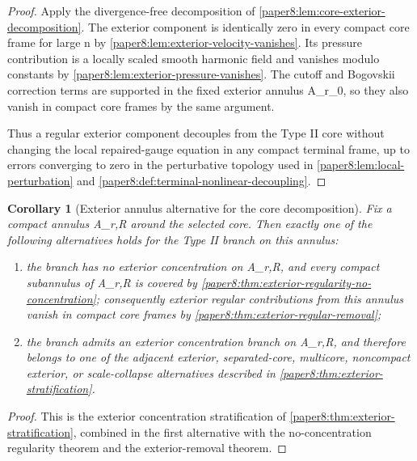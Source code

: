 \documentclass[11pt]{amsart}
\def\({}%
\def\){}%
\theoremstyle{plain}
\newtheorem{corollary}[corollary]{Corollary}
\theoremstyle{definition}
\theoremstyle{remark}
\begin{document}
\begin{proof}
Apply the divergence-free decomposition of
\cref{paper8:lem:core-exterior-decomposition}.  The exterior component is
identically zero in every compact core frame for large \(n\) by
\cref{paper8:lem:exterior-velocity-vanishes}.  Its pressure contribution is a
locally scaled smooth harmonic field and vanishes modulo constants by
\cref{paper8:lem:exterior-pressure-vanishes}.  The cutoff and Bogovskii
correction terms are supported in the fixed exterior annulus \(A_{r_0}\), so
they also vanish in compact core frames by the same argument.

Thus a regular exterior component decouples from the Type II core without
changing the local repaired-gauge equation in any compact terminal frame, up
to errors converging to zero in the perturbative topology used in
\cref{paper8:lem:local-perturbation} and
\cref{paper8:def:terminal-nonlinear-decoupling}.
\end{proof}

\begin{corollary}[Exterior annulus alternative for the core decomposition]
\label{paper8:cor:exterior-annulus-alternative}
Fix a compact annulus \(A_{r,R}\) around the selected core.  Then exactly one
of the following alternatives holds for the Type II branch on this annulus:
\begin{enumerate}[label=\textup{(\roman*)}]
\item the branch has no exterior concentration on \(A_{r,R}\), and every
compact subannulus of \(A_{r,R}\) is covered by
\cref{paper8:thm:exterior-regularity-no-concentration}; consequently exterior
regular contributions from this annulus vanish in compact core frames
by \cref{paper8:thm:exterior-regular-removal};
\item the branch admits an exterior concentration branch on \(A_{r,R}\), and
therefore belongs to one of the adjacent exterior, separated-core, multicore,
noncompact exterior, or scale-collapse alternatives described in
\cref{paper8:thm:exterior-stratification}.
\end{enumerate}
\end{corollary}

\begin{proof}
This is the exterior concentration stratification of
\cref{paper8:thm:exterior-stratification}, combined in the first alternative
with the no-concentration regularity theorem and the exterior-removal theorem.
\end{proof}
\end{document}
